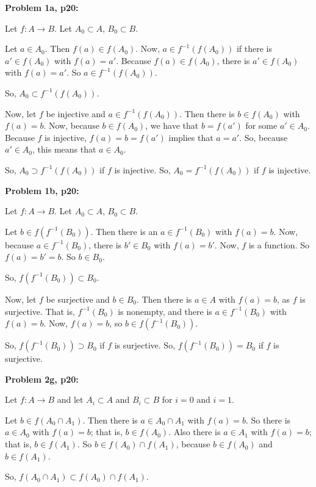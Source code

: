 \documentclass[a4paper,12pt]{article}
\begin{document}
{\bf Problem 1a, p20:}

Let $f: A \to B$. Let $A_0 \subset A$, $B_0 \subset B$.

Let $a \in A_0$. Then $f(a) \in f(A_0)$. Now, $a \in f^{-1}(f(A_0))$ if there is $a' \in f(A_0)$ with $f(a) = a'$. Because $f(a) \in f(A_0)$, there is $a' \in f(A_0)$ with $f(a) = a'$. So $a \in f^{-1}(f(A_0))$.

So, $A_0 \subset f^{-1}(f(A_0))$.

Now, let $f$ be injective and $a \in f^{-1}(f(A_0))$. Then there is $b \in f(A_0)$ with $f(a) = b$. Now, because $b \in f(A_0)$, we have that $b = f(a')$ for some $a' \in A_0$. Because $f$ is injective, $f(a) = b = f(a')$ implies that $a = a'$. So, because $a' \in A_0$, this means that $a \in A_0$.

So, $A_0 \supset f^{-1}(f(A_0))$ if $f$ is injective. So, $A_0 = f^{-1}(f(A_0))$ if $f$ is injective.

\shunt

{\bf Problem 1b, p20:}

Let $f: A \to B$. Let $A_0 \subset A$, $B_0 \subset B$.

Let $b \in f(f^{-1}(B_0))$. Then there is an $a \in f^{-1}(B_0)$ with $f(a) = b$. Now, because $a \in f^{-1}(B_0)$, there is $b' \in B_0$ with $f(a) = b'$. Now, $f$ is a function. So $f(a) = b' = b$. So $b \in B_0$.

So, $f(f^{-1}(B_0)) \subset B_0$.

Now, let $f$ be surjective and $b \in B_0$. Then there is $a \in A$ with $f(a) = b$, as $f$ is surjective. That is, $f^{-1}(B_0)$ is nonempty, and there is $a \in f^{-1}(B_0)$ with $f(a) = b$. Now, $f(a) = b$, so $b \in f(f^{-1}(B_0))$.  %

So, $f(f^{-1}(B_0)) \supset B_0$ if $f$ is surjective. So, $f(f^{-1}(B_0)) = B_0$ if $f$ is surjective.

\shunt

{\bf Problem 2g, p20:}

Let $f: A \to B$ and let $A_i \subset A$ and $B_i \subset B$ for $i = 0 $ and $i = 1$.

Let $b \in f(A_0 \cap A_1)$. Then there is $a \in A_0 \cap A_1$ with $f(a) = b$. So there is $a \in A_0$ with $f(a) = b$; that is, $b \in f(A_0)$. Also there is $a \in A_1$ with $f(a) = b$; that is, $b \in f(A_1)$. So $b \in f(A_0) \cap f(A_1)$, because $b \in f(A_0)$ and $b \in f(A_1)$.

So, $f(A_0 \cap A_1) \subset f(A_0) \cap f(A_1)$.
\end{document}
